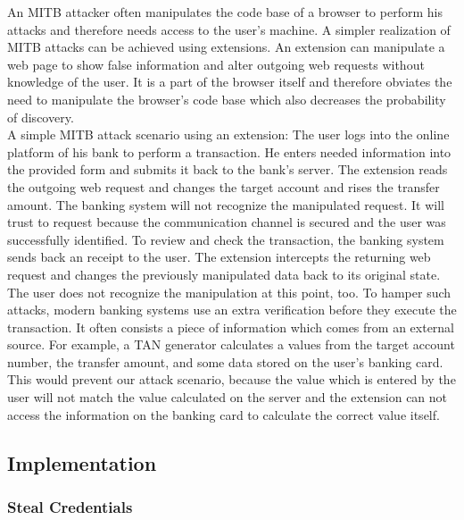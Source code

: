 			An MITB attacker often manipulates the code base of a browser to perform his attacks and therefore needs access to the user's machine. A simpler realization of MITB attacks can be achieved using extensions. An extension can manipulate a web page to show false information and alter outgoing web requests without knowledge of the user. It is a part of the browser itself and therefore obviates the need to manipulate the browser's code base which also decreases the probability of discovery. \\
			
			A simple MITB attack scenario using an extension: The user logs into the online platform of his bank to perform a transaction. He enters needed information into the provided form and submits it back to the bank's server. The extension reads the outgoing web request and changes the target account and rises the transfer amount. The banking system will not recognize the manipulated request. It will trust to request because the communication channel is secured and the user was successfully identified. To review and check the transaction, the banking system sends back an receipt to the user. The extension intercepts the returning web request and changes the previously manipulated data back to its original state. The user does not recognize the manipulation at this point, too. To hamper such attacks, modern banking systems use an extra verification before they execute the transaction. It often consists a piece of information which comes from an external source. For example, a TAN generator calculates a values from the target account number, the transfer amount, and some data stored on the user's banking card. This would prevent our attack scenario, because the value which is entered by the user will not match the value calculated on the server and the extension can not access the information on the banking card to calculate the correct value itself. \\
	 
	\subsection{Implementation}

	 
		\subsubsection{Steal Credentials}
		
